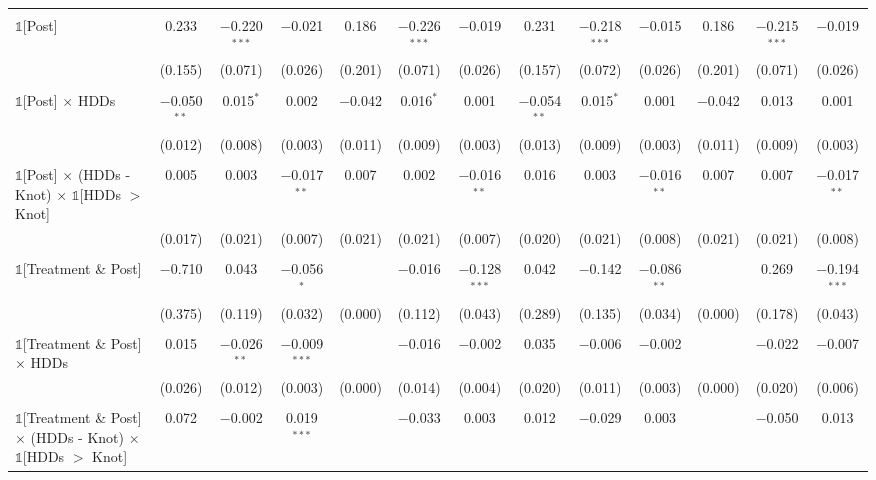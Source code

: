 \begin{table}[!htbp]
\begin{tabular}{@{\extracolsep{20pt}}lcccccccccccc}
  & & & & & & & & & & & & \\ 
 $\mathbb{1}$[Post] & 0.233 & $-$0.220$^{***}$ & $-$0.021 & 0.186 & $-$0.226$^{***}$ & $-$0.019 & 0.231 & $-$0.218$^{***}$ & $-$0.015 & 0.186 & $-$0.215$^{***}$ & $-$0.019 \\ 
  & (0.155) & (0.071) & (0.026) & (0.201) & (0.071) & (0.026) & (0.157) & (0.072) & (0.026) & (0.201) & (0.071) & (0.026) \\ 
  & & & & & & & & & & & & \\ 
 $\mathbb{1}$[Post] $\times$ HDDs & $-$0.050$^{**}$ & 0.015$^{*}$ & 0.002 & $-$0.042 & 0.016$^{*}$ & 0.001 & $-$0.054$^{**}$ & 0.015$^{*}$ & 0.001 & $-$0.042 & 0.013 & 0.001 \\ 
  & (0.012) & (0.008) & (0.003) & (0.011) & (0.009) & (0.003) & (0.013) & (0.009) & (0.003) & (0.011) & (0.009) & (0.003) \\ 
  & & & & & & & & & & & & \\ 
 $\mathbb{1}$[Post] $\times$ (HDDs - Knot) $\times$ $\mathbb{1}$[HDDs $>$ Knot] & 0.005 & 0.003 & $-$0.017$^{**}$ & 0.007 & 0.002 & $-$0.016$^{**}$ & 0.016 & 0.003 & $-$0.016$^{**}$ & 0.007 & 0.007 & $-$0.017$^{**}$ \\ 
  & (0.017) & (0.021) & (0.007) & (0.021) & (0.021) & (0.007) & (0.020) & (0.021) & (0.008) & (0.021) & (0.021) & (0.008) \\ 
  & & & & & & & & & & & & \\ 
 $\mathbb{1}$[Treatment \& Post] & $-$0.710 & 0.043 & $-$0.056$^{*}$ &  & $-$0.016 & $-$0.128$^{***}$ & 0.042 & $-$0.142 & $-$0.086$^{**}$ &  & 0.269 & $-$0.194$^{***}$ \\ 
  & (0.375) & (0.119) & (0.032) & (0.000) & (0.112) & (0.043) & (0.289) & (0.135) & (0.034) & (0.000) & (0.178) & (0.043) \\ 
  & & & & & & & & & & & & \\ 
 $\mathbb{1}$[Treatment \& Post] $\times$ HDDs & 0.015 & $-$0.026$^{**}$ & $-$0.009$^{***}$ &  & $-$0.016 & $-$0.002 & 0.035 & $-$0.006 & $-$0.002 &  & $-$0.022 & $-$0.007 \\ 
  & (0.026) & (0.012) & (0.003) & (0.000) & (0.014) & (0.004) & (0.020) & (0.011) & (0.003) & (0.000) & (0.020) & (0.006) \\ 
  & & & & & & & & & & & & \\ 
 $\mathbb{1}$[Treatment \& Post] $\times$ (HDDs - Knot) $\times$ $\mathbb{1}$[HDDs $>$ Knot] & 0.072 & $-$0.002 & 0.019$^{***}$ &  & $-$0.033 & 0.003 & 0.012 & $-$0.029 & 0.003 &  & $-$0.050 & 0.013 \\ 

\end{tabular}
\end{table}
